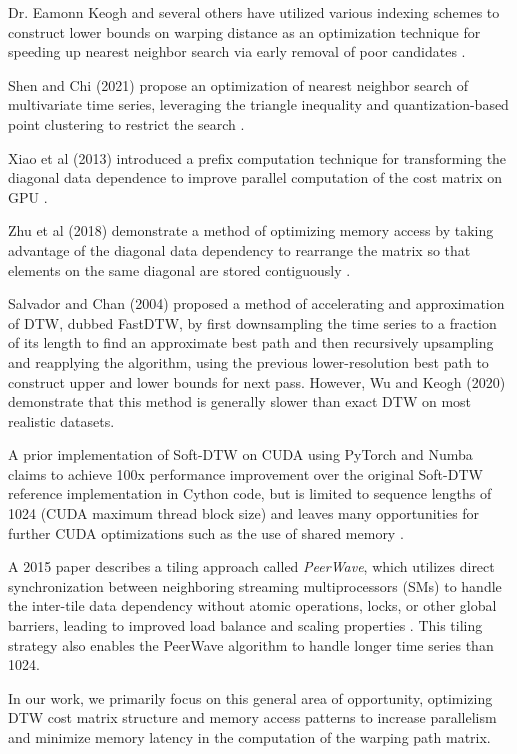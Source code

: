 \documentclass[12pt, letterpaper]{article}
\begin{document}
Dr. Eamonn Keogh and several others have utilized various indexing schemes to
construct lower bounds on warping distance as an optimization technique for
speeding up nearest neighbor search via early removal of poor candidates
\cite{keogh_exact_2002}.

Shen and Chi (2021) propose an optimization of nearest neighbor search of
multivariate time series, leveraging the triangle inequality and
quantization-based point clustering to restrict the search
\cite{shen_tc-dtw_2021}.

Xiao et al (2013) introduced a prefix computation technique for transforming the
diagonal data dependence to improve parallel computation of the cost matrix on
GPU \cite{xiao_parallelizing_2013}.

Zhu et al (2018) demonstrate a method of optimizing memory access by taking
advantage of the diagonal data dependency to rearrange the matrix so that
elements on the same diagonal are stored contiguously
\cite{zhu_developing_2018}.

Salvador and Chan (2004) \cite{salvador_fastdtw_2004} proposed a method of
accelerating and approximation of DTW, dubbed FastDTW, by first downsampling the
time series to a fraction of its length to find an approximate best path and
then recursively upsampling and reapplying the algorithm, using the previous
lower-resolution best path to construct upper and lower bounds for next
pass. However, Wu and Keogh (2020) demonstrate that this method is generally
slower than exact DTW on most realistic datasets.

A prior implementation of Soft-DTW on CUDA using PyTorch and Numba claims to
achieve 100x performance improvement over the original Soft-DTW reference
implementation in Cython code, but is limited to sequence lengths of 1024 (CUDA
maximum thread block size) and leaves many opportunities for further CUDA
optimizations such as the use of shared memory
\cite{maghoumi_pytorch-softdtw-cuda_2021}.

A 2015 paper describes a tiling approach called \emph{PeerWave}, which utilizes
direct synchronization between neighboring streaming multiprocessors (SMs) to
handle the inter-tile data dependency without atomic operations, locks, or other
global barriers, leading to improved load balance and scaling properties
\cite{belviranli_peerwave_2015}. This tiling strategy also enables the PeerWave
algorithm to handle longer time series than 1024.

In our work, we primarily focus on this general area of opportunity, optimizing
DTW cost matrix structure and memory access patterns to increase parallelism and
minimize memory latency in the computation of the warping path matrix.
\end{document}
